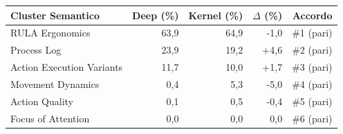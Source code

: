 \begin{tabular*}{\linewidth}{@{}l@{\extracolsep{\fill}}rrrr@{}}
\toprule
\textbf{Cluster Semantico} & \textbf{Deep (\%)} & \textbf{Kernel (\%)} & \textbf{$\Delta$ (\%)} & \textbf{Accordo} \\
\midrule
RULA Ergonomics & 63{,}9 & 64{,}9 & -1{,}0 & \#1 (pari) \\
Process Log & 23{,}9 & 19{,}2 & +4{,}6 & \#2 (pari) \\
Action Execution Variants & 11{,}7 & 10{,}0 & +1{,}7 & \#3 (pari) \\
Movement Dynamics & 0{,}4 & 5{,}3 & -5{,}0 & \#4 (pari) \\
Action Quality & 0{,}1 & 0{,}5 & -0{,}4 & \#5 (pari) \\
Focus of Attention & 0{,}0 & 0{,}0 & 0{,}0 & \#6 (pari) \\
\bottomrule
\end{tabular*}
